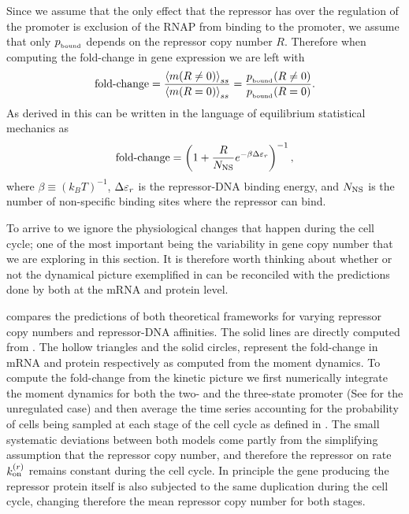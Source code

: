 Since we assume that the only effect that the repressor has over the regulation
of the promoter is exclusion of the RNAP from binding to the promoter, we assume
that only $p_{_\text{bound}}$ depends on the repressor copy number $R$. Therefore when
computing the fold-change in gene expression we  are left with
\begin{equation}
  \text{fold-change} = {\left\langle m (R \neq 0) \right\rangle_{ss} \over \left\langle m (R = 0) \right\rangle_{ss}}
              = {p_{_\text{bound}} (R \neq 0) \over p_{_\text{bound}} (R = 0)}.
\end{equation}
As derived in \cite{Garcia2011c} this can be written in the language of
equilibrium statistical mechanics as
\begin{equation}
  \text{fold-change} = \left(1 + {R \over N_\text{NS}}e^{-\beta \Delta\varepsilon_r}  \right)^{-1},
  \label{seq_fold_change_thermo}
\end{equation}
where $\beta \equiv (k_BT)^{-1}$, $\Delta\varepsilon_r$ is the repressor-DNA binding energy, and
$N_\text{NS}$ is the number of non-specific binding sites where the repressor can bind.

To arrive to  we ignore the physiological changes
that happen during the cell cycle; one of the most important being the
variability in gene copy number that we are exploring in this section. It is
therefore worth thinking about whether or not the dynamical picture exemplified
in  can be reconciled with the predictions done by
 both at the mRNA and protein level.

 compares the predictions of both theoretical
frameworks for varying repressor copy numbers and repressor-DNA affinities. The
solid lines are directly computed from . The hollow
triangles and the solid circles, represent the fold-change in mRNA and protein
respectively as computed from the moment dynamics. To compute the fold-change
from the kinetic picture we first numerically integrate the moment dynamics for
both the two- and the three-state promoter (See  for
the unregulated case) and then average the time series accounting for the
probability of cells being sampled at each stage of the cell cycle as defined in
. The small systematic deviations between both models come
partly from the simplifying assumption that the repressor copy number, and
therefore the repressor on rate $k^{(r)}_{\text{on}}$ remains constant during the cell cycle.
In principle the gene producing the repressor protein itself is also subjected
to the same duplication during the cell cycle, changing therefore the mean
repressor copy number for both stages.

